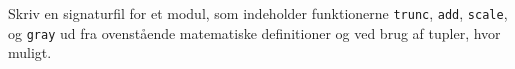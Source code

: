 Skriv en signaturfil for et modul, som indeholder funktionerne \lstinline{trunc}, \lstinline{add}, \lstinline{scale}, og \lstinline{gray} ud fra ovenstående matematiske definitioner og ved brug af tupler, hvor muligt.
